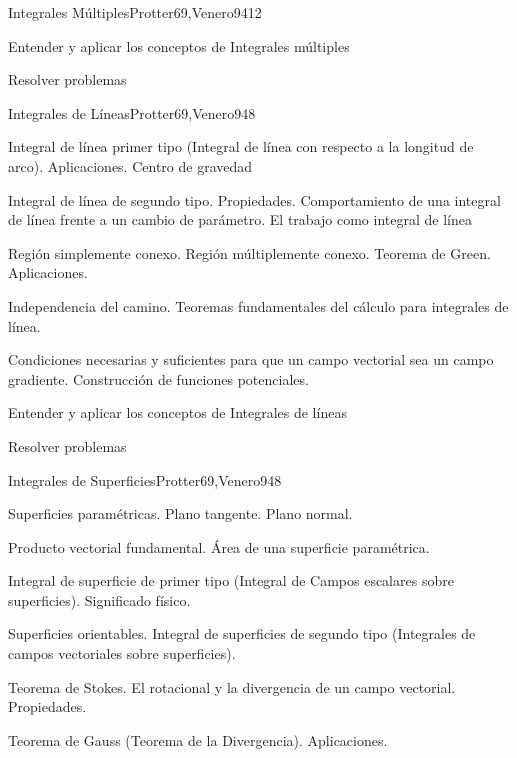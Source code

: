 \begin{syllabus}
\begin{unit}{Integrales Múltiples}{Protter69,Venero94}{12}
   \begin{learningoutcomes}
         \item  Entender y aplicar los conceptos de Integrales múltiples
         \item  Resolver problemas
   \end{learningoutcomes}
\end{unit}

\begin{unit}{Integrales de Líneas}{Protter69,Venero94}{8}
   \begin{topics}
	\item  Integral de línea primer tipo (Integral de línea con respecto a la longitud de arco). Aplicaciones. Centro de gravedad
	\item  Integral de línea de segundo tipo. Propiedades. Comportamiento de una integral de línea frente a un cambio de parámetro. El trabajo como integral de línea
	\item  Región simplemente conexo. Región múltiplemente conexo. Teorema de Green. Aplicaciones.
	\item  Independencia del camino. Teoremas fundamentales del cálculo para integrales de línea.
	\item Condiciones necesarias y suficientes para que un campo vectorial sea un campo gradiente. Construcción de funciones potenciales.
   \end{topics}

   \begin{learningoutcomes}
         \item  Entender y aplicar los conceptos de Integrales de líneas
         \item  Resolver problemas
   \end{learningoutcomes}
\end{unit}

\begin{unit}{Integrales de Superficies}{Protter69,Venero94}{8}
   \begin{topics}
         \item  Superficies paramétricas. Plano tangente. Plano normal.
	 \item  Producto vectorial fundamental. Área de una superficie paramétrica.
         \item  Integral de superficie de primer tipo (Integral de Campos escalares sobre superficies). Significado físico.
	 \item  Superficies orientables. Integral de superficies de segundo tipo (Integrales de campos vectoriales sobre superficies).
         \item  Teorema de Stokes. El rotacional y la divergencia de un campo vectorial. Propiedades.
         \item  Teorema de Gauss (Teorema de la Divergencia). Aplicaciones.
   \end{topics}


\end{unit}
\end{syllabus}
